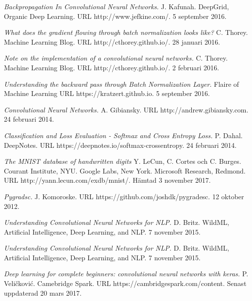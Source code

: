 \documentclass[a4paper,11pt,twoside]{article}
\begin{document}
\begin{thebibliography}{99}
	\textit{Backpropagation In Convolutional Neural Networks.}
	J. Kafunah.
    DeepGrid, Organic Deep Learning. 
    URL http://www.jefkine.com/.
	5 september 2016.

	\textit{What does the gradient flowing through batch normalization looks like?}
	C. Thorey.
    Machine Learning Blog. 
    URL http://cthorey.github.io/.
	28 januari 2016.
	
	\textit{Note on the implementation of a convolutional neural networks.}
	C. Thorey.
    Machine Learning Blog. 
    URL http://cthorey.github.io/.
	2 februari 2016.
	
	\textit{Understanding the backward pass through Batch Normalization Layer.}
	Flaire of Machine Learning
    URL https://kratzert.github.io.
	5 september 2016.
	
	\textit{Convolutional Neural Networks.}
	A. Gibiansky.
    URL http://andrew.gibiansky.com.
	24 februari 2014.
	
	\textit{Classification and Loss Evaluation - Softmax and Cross Entropy Loss.}
	P. Dahal. 
	DeepNotes.
    URL https://deepnotes.io/softmax-crossentropy.
	24 februari 2014.
	
	\textit{The MNIST database of handwritten digits}
	Y. LeCun, C. Cortes och C. Burges. Courant Institute, NYU. Google Labs, New York. Microsoft Research, Redmond. 
	URL http://yann.lecun.com/exdb/mnist/.
	Hämtad 3 november 2017.
	
	\textit{Pygradsc.}
	J. Komoroske.
	URL https://github.com/joshdk/pygradesc.
	12 oktober 2012.
	
	\textit{Understanding Convolutional Neural Networks for NLP.}
	D. Britz.
	WildML, Artificial Intelligence, Deep Learning, and NLP.
	7 november 2015.
	
	\textit{Understanding Convolutional Neural Networks for NLP.}
	D. Britz.
	WildML, Artificial Intelligence, Deep Learning, and NLP.
	7 november 2015.
	
	\textit{Deep learning for complete beginners: convolutional neural networks with keras.}
	P. Veličković.
	Camebridge Spark. 
	URL https://cambridgespark.com/content.
	Senast uppdaterad 20 mars 2017.
\end{thebibliography}
\end{document}
